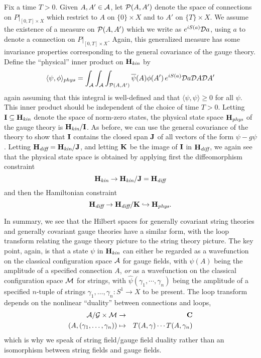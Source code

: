 \documentclass[12pt]{article}
\newcommand{\ba}{\begin{eqnarray}}
\newcommand{\maps}{\colon}
\newcommand{\ea}{\end{eqnarray}}
\newcommand{\A}{{\cal A}}
\newcommand{\G}{{\cal G}}
\newcommand{\M}{{\cal M}}
\renewcommand{\P}{{\cal P}}
\newcommand{\D}{{\cal D}}
\renewcommand{\H}{{\bf H}}
\newcommand{\I}{{\bf I}}
\newcommand{\J}{{\bf J}}
\newcommand{\K}{{\bf K}}
\newcommand{\C}{{\bf C}}
\begin{document}
Fix a time $T > 0$.  Given $A, A' \in \A$,
let $\P(A,A')$ denote the space of connections on
$P|_{[0,T] \times X}$ which restrict to $A$ on $\{0\} \times X$ and
to $A'$ on $\{T\} \times X$.
We assume the existence of a measure on
$\P(A,A')$ which we write as $ e^{iS(a)}
\D a$, using $a$ to denote a connection on $P|_{[0,T] \times X}$.
Again, this generalized measure has some invariance properties
corresponding to the general covariance of the gauge theory.
Define the ``physical'' inner product on $\H_{\textit{kin}}$ by
\[ \langle \psi,\phi\rangle_{phys} = \int_{\A} \int_{\A} \int_{\P(A,A')}
\overline\psi(A) \phi(A') \, e^{iS(a)} \D a\D A \D A'\]
again assuming that this integral is well-defined and that
$\langle \psi,\psi \rangle \ge 0$ for all $\psi$.
This inner product should be independent of the choice of time $T > 0$.
Letting $\I \subseteq \H_{\textit{kin}}$ denote the space of norm-zero states,
the physical state space $\H_{\textit{phys}}$ of the gauge theory is
$\H_{\textit{kin}}/\I$.  As before, we can use the general covariance of the theory
to show that $\I$ contains the closed span $\J$ of all vectors of
the form $\psi - g\psi$.  Letting $\H_{\textit{diff}} = \H_{\textit{kin}}/\J$,
and letting $\K$ be the image of $\I$ in $\H_{\textit{diff}}$, we again see
that the physical state space is obtained by applying first the
diffeomorphism constraint
\[     \H_{\textit{kin}} \to \H_{\textit{kin}}/\J = \H_{\textit{diff}}   \]
and then the Hamiltonian constraint
\[  \H_{\textit{diff}} \to  \H_{\textit{diff}}/\K \hookrightarrow \H_{\textit{phys}}. \]


In summary, we see that the Hilbert spaces for generally covariant string
theories and generally covariant gauge theories have a similar form,  with
the loop transform relating the gauge theory picture to the string theory
picture.   The key point, again, is that a state $\psi$ in $\H_{\textit{kin}}$ can
either be regarded as a wavefunction on the classical configuration space
$\A$ for gauge fields, with $\psi(A)$ being the amplitude of a specified
connection $A$, {\it or} as a wavefunction on the classical configuration
space $\M$ for strings, with $\hat\psi(\gamma_1, \cdots, \gamma_n)$ being
the amplitude of a specified $n$-tuple of strings $\gamma_1, \dots,
\gamma_n \maps S^1 \to X$ to be present.   The loop transform depends on
the nonlinear ``duality'' between connections and loops,
\ba              \A/\G \times \M &\to& \C  \nonumber\cr
                 (A, (\gamma_1, \dots, \gamma_n)) &\mapsto&
T(A,\gamma)\cdots T(A,\gamma_n)  \nonumber\ea
which is why we speak of string field/gauge field duality rather than
an isomorphism between string fields and gauge fields.
\end{document}
